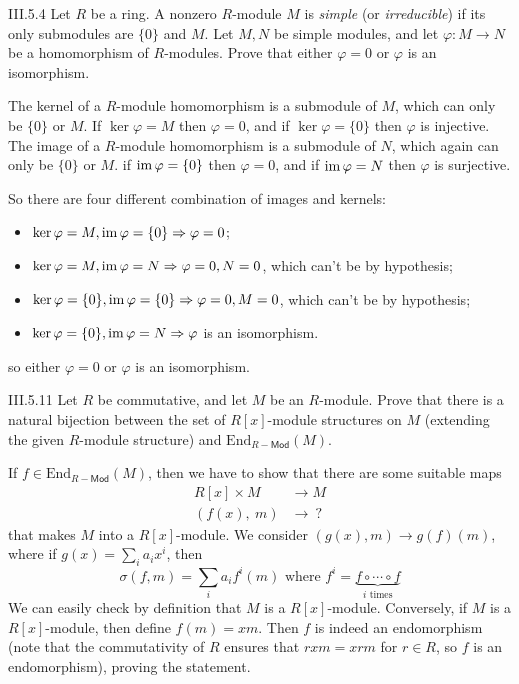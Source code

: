 \begin{problem}{III.5.4}
Let $R$ be a ring. A nonzero $R$-module $M$ is \emph{simple} (or \emph{irreducible}) if its only 
submodules are $\{0\}$ and $M$. Let $M, N$ be simple modules, and let $\varphi: M \to N$ be 
a homomorphism of $R$-modules. Prove that either $\varphi = 0$ or $\varphi$ is an isomorphism. 
\end{problem}
\begin{pf}
The kernel of a $R$-module homomorphism is a submodule of $M$, which can only be $\{0\}$ or $M$. If $\ker \varphi = M$ then $\varphi = 0$, and if $\ker \varphi = \{0\}$ then $\varphi$ is injective. The image of a $R$-module homomorphism is a submodule of $N$, which again can only be $\{0\}$ or $M$. if $\operatorname{im} \varphi = \{0\}$ then $\varphi = 0$, and if $\operatorname{im} \varphi = N$ then $\varphi$ is surjective. 

So there are four different combination of images and kernels:
\begin{itemize}
    \setlength\itemsep{0pt}
    \item $\ker \varphi = M, \operatorname{im} \varphi = \{0\} \Rightarrow \varphi = 0$;
    \item $\ker \varphi = M, \operatorname{im} \varphi = N \Rightarrow \varphi = 0, N = 0$, which can't be by hypothesis;
    \item $\ker \varphi = \{0\}, \operatorname{im} \varphi = \{0\} \Rightarrow \varphi = 0, M = 0$, which can't be by hypothesis;
    \item $\ker \varphi = \{0\}, \operatorname{im} \varphi = N \Rightarrow \varphi$ is an isomorphism.
\end{itemize}
so either $\varphi = 0$ or $\varphi$ is an isomorphism. 
\end{pf}

\begin{problem}{III.5.11}
Let $R$ be commutative, and let $M$ be an $R$-module. Prove that there is a natural bijection between the set of $R[x]$-module structures on $M$ (extending the given $R$-module structure) and $\text{End}_{R-\mathsf{Mod}}(M)$.
\end{problem}
\begin{pf}
If $f \in \text{End}_{R-\textsf{Mod}}(M)$, then we have to show that there are some suitable maps
\begin{align*}
R[x] \times M &\to M \\
(f(x), \:m) &\to \: ?
\end{align*}
that makes $M$ into a $R[x]$-module. We consider $(g(x),m) \to g(f)(m)$, where if $g(x) = \sum_i a_i x^i$, then
\[
\sigma(f,m) = \sum_{i} a_i f^i(m) \text{ where } f^i = \underbrace{f \circ \cdots \circ f}_{i\text{ times}}
\]
We can easily check by definition that $M$ is a $R[x]$-module. Conversely, if $M$ is a $R[x]$-module, then define $f(m) = xm$. Then $f$ is indeed an endomorphism (note that the commutativity of $R$ ensures that $rxm = xrm$ for $r \in R$, so $f$ is an endomorphism), proving the statement.
\end{pf}

